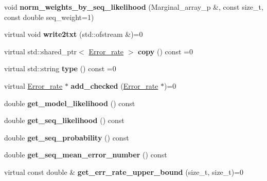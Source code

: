 \begin{DoxyCompactItemize}
\mbox{\label{classError__rate_ae93054df4880e8fd59770e6a091768c9}} 
void {\bfseries norm\+\_\+weights\+\_\+by\+\_\+seq\+\_\+likelihood} (Marginal\+\_\+array\+\_\+p \&, const size\+\_\+t, const double seq\+\_\+weight=1)
\item 
\mbox{\label{classError__rate_a03773cbdcb52e0a231ee42f5bdce5cdc}} 
virtual void {\bfseries write2txt} (std\+::ofstream \&)=0
\item 
\mbox{\label{classError__rate_a86eff4f0308e3232de4fd54bbdc93c04}} 
virtual std\+::shared\+\_\+ptr$<$ \hyperlink{classError__rate}{Error\+\_\+rate} $>$ {\bfseries copy} () const =0
\item 
\mbox{\label{classError__rate_ad170cdf5e6c4825f4ca3bf7a8d7b254f}} 
virtual std\+::string {\bfseries type} () const =0
\item 
\mbox{\label{classError__rate_a5d5a7bde961ef0bd9ae5e22156b18552}} 
virtual \hyperlink{classError__rate}{Error\+\_\+rate} $\ast$ {\bfseries add\+\_\+checked} (\hyperlink{classError__rate}{Error\+\_\+rate} $\ast$)=0
\item 
\mbox{\label{classError__rate_aa2dd5f87d6550df93542d598f546df44}} 
double {\bfseries get\+\_\+model\+\_\+likelihood} () const
\item 
\mbox{\label{classError__rate_a4d7037b07adf8cca2d0a173f867749e0}} 
double {\bfseries get\+\_\+seq\+\_\+likelihood} () const
\item 
\mbox{\label{classError__rate_a41990ead366e9882289ddedb6bfd64be}} 
double {\bfseries get\+\_\+seq\+\_\+probability} () const
\item 
\mbox{\label{classError__rate_a28d3b3140dec1002e4ae05f0c4bcc4cd}} 
double {\bfseries get\+\_\+seq\+\_\+mean\+\_\+error\+\_\+number} () const
\item 
\mbox{\label{classError__rate_ac66afd48ecfe612c9c0d2751372de620}} 
virtual const double \& {\bfseries get\+\_\+err\+\_\+rate\+\_\+upper\+\_\+bound} (size\+\_\+t, size\+\_\+t)=0

\end{DoxyCompactItemize}
